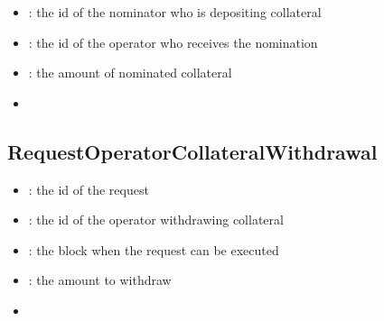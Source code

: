 \documentclass[a4paper,10pt,english]{sphinxmanual}
\begin{document}

\begin{itemize}
\item {} 
: the id of the nominator who is depositing collateral

\item {} 
: the id of the operator who receives the nomination

\item {} 
: the amount of nominated collateral

\end{itemize}

\begin{itemize}
\item {} 
{\hyperref[\detokenize{spec/nomination:depositnominatedcollateral}]{}}

\end{itemize}


\subsection{RequestOperatorCollateralWithdrawal}
\label{\detokenize{spec/nomination:id41}}


\begin{itemize}
\item {} 
: the id of the request

\item {} 
: the id of the operator withdrawing collateral

\item {} 
: the block when the request can be executed

\item {} 
: the amount to withdraw

\end{itemize}

\begin{itemize}
\item {} 
{\hyperref[\detokenize{spec/nomination:requestoperatorcollateralwithdrawal}]{}}

\end{itemize}
\end{document}
